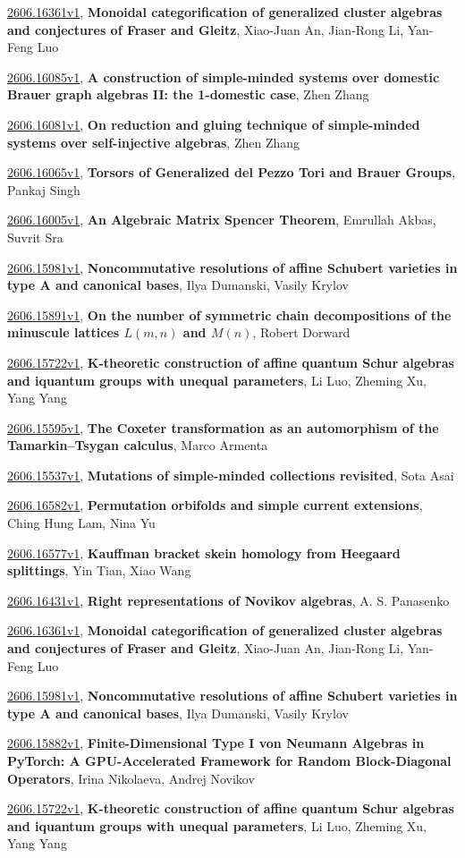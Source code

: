\documentclass[9pt, a4paper]{article}
\theoremstyle{plain}
\theoremstyle{definition}
\theoremstyle{remark}
\newcommand{\arxiv}[3]{\href{https://arxiv.org/abs/#1}{#1}, \textbf{\textcolor{arxivblue}{#2}}, #3}
\begin{document}
\arxiv{2606.16361v1}{Monoidal categorification of generalized cluster algebras and conjectures of Fraser and Gleitz}{Xiao-Juan An, Jian-Rong Li, Yan-Feng Luo}

\arxiv{2606.16085v1}{A construction of simple-minded systems over domestic Brauer graph algebras II: the 1-domestic case}{Zhen Zhang}

\arxiv{2606.16081v1}{On reduction and gluing technique of simple-minded systems over self-injective algebras}{Zhen Zhang}

\arxiv{2606.16065v1}{Torsors of Generalized del Pezzo Tori and Brauer Groups}{Pankaj Singh}

\arxiv{2606.16005v1}{An Algebraic Matrix Spencer Theorem}{Emrullah Akbas, Suvrit Sra}

\arxiv{2606.15981v1}{Noncommutative resolutions of affine Schubert varieties in type A and canonical bases}{Ilya Dumanski, Vasily Krylov}

\arxiv{2606.15891v1}{On the number of symmetric chain decompositions of the minuscule lattices $L(m,n)$ and $M(n)$}{Robert Dorward}

\arxiv{2606.15722v1}{K-theoretic construction of affine quantum Schur algebras and iquantum groups with unequal parameters}{Li Luo, Zheming Xu, Yang Yang}

\arxiv{2606.15595v1}{The Coxeter transformation as an automorphism of the Tamarkin--Tsygan calculus}{Marco Armenta}

\arxiv{2606.15537v1}{Mutations of simple-minded collections revisited}{Sota Asai}

\arxiv{2606.16582v1}{Permutation orbifolds and simple current extensions}{Ching Hung Lam, Nina Yu}

\arxiv{2606.16577v1}{Kauffman bracket skein homology from Heegaard splittings}{Yin Tian, Xiao Wang}

\arxiv{2606.16431v1}{Right representations of Novikov algebras}{A. S. Panasenko}

\arxiv{2606.16361v1}{Monoidal categorification of generalized cluster algebras and conjectures of Fraser and Gleitz}{Xiao-Juan An, Jian-Rong Li, Yan-Feng Luo}

\arxiv{2606.15981v1}{Noncommutative resolutions of affine Schubert varieties in type A and canonical bases}{Ilya Dumanski, Vasily Krylov}

\arxiv{2606.15882v1}{Finite-Dimensional Type I von Neumann Algebras in PyTorch: A GPU-Accelerated Framework for Random Block-Diagonal Operators}{Irina Nikolaeva, Andrej Novikov}

\arxiv{2606.15722v1}{K-theoretic construction of affine quantum Schur algebras and iquantum groups with unequal parameters}{Li Luo, Zheming Xu, Yang Yang}

\end{document}
